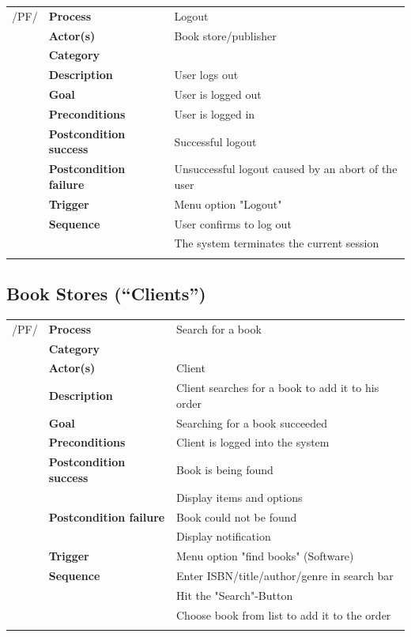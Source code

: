 \documentclass[11pt,a4paper,oneside,svgnames]{report}
\begin{document}
\noindent
\begin{tabular}{p{1.5cm}p{3cm}p{8cm}}
/PF/	& \textbf{Process} & Logout\\
		& \textbf{Actor(s)} & Book store/publisher\\
		& \textbf{Category} & \\
		& \textbf{Description}	 & User logs out\\
		& \textbf{Goal} & User is logged out\\
		& \textbf{Preconditions} & User is logged in\\
		& \textbf{Postcondition success} & Successful logout\\
		& \textbf{Postcondition failure} & Unsuccessful logout caused by an abort of the user\\
		& \textbf{Trigger} & Menu option "Logout"\\
		& \textbf{Sequence} & User confirms to log out\\
		& & The system terminates the current session\\
\hfill \\
\end{tabular}


\subsection{Book Stores (``Clients'')}

\noindent
\begin{tabular}{p{1.5cm}p{3cm}p{8cm}}
	 /PF/	& \textbf{Process} & Search for a book\\ 
		& \textbf{Category} & \\
		& \textbf{Actor(s)} & Client\\ 
		& \textbf{Description}	 & Client searches for a book to add it to his order\\ 
		& \textbf{Goal} & Searching for a book succeeded\\
		& \textbf{Preconditions} & Client is logged into the system\\
		& \textbf{Postcondition success} & Book is being found\\
		& & Display items and options\\
		& \textbf{Postcondition failure} & Book could not be found\\
		& & Display notification\\
		& \textbf{Trigger} & Menu option "find books" (Software)\\
		& \textbf{Sequence} & Enter ISBN/title/author/genre in search bar\\
		& & Hit the "Search"-Button\\
		& & Choose book from list to add it to the order\\
\hfill \\
\end{tabular}
\end{document}
